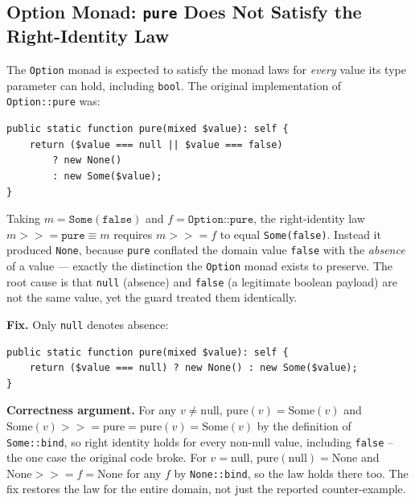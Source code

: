 \documentclass[a4paper,12pt,fleqn]{article}
\begin{document}
\subsection{Option Monad: \texttt{pure} Does Not Satisfy the Right-Identity Law}\label{sec:bug1}

The \texttt{Option} monad is expected to satisfy the monad laws for \emph{every} value its type parameter can hold, including \texttt{bool}. The original implementation of \texttt{Option::pure} was:

\begin{lstlisting}[caption={Original \texttt{Option::pure} (src/CategoryTheory.php)}]
public static function pure(mixed $value): self {
    return ($value === null || $value === false)
        ? new None()
        : new Some($value);
}
\end{lstlisting}

Taking $m = \mathtt{Some(false)}$ and $f = \texttt{Option::pure}$, the right-identity law $m \mathbin{>\!\!>\!\!=} \texttt{pure} \equiv m$ requires $m\mathbin{>\!\!>\!\!=}f$ to equal \texttt{Some(false)}. Instead it produced \texttt{None}, because \texttt{pure} conflated the domain value \texttt{false} with the \emph{absence} of a value — exactly the distinction the \texttt{Option} monad exists to preserve. The root cause is that \texttt{null} (absence) and \texttt{false} (a legitimate boolean payload) are not the same value, yet the guard treated them identically.

\textbf{Fix.} Only \texttt{null} denotes absence:
\begin{lstlisting}[caption={Fixed \texttt{Option::pure}}]
public static function pure(mixed $value): self {
    return ($value === null) ? new None() : new Some($value);
}
\end{lstlisting}

\textbf{Correctness argument.} For any $v \neq \mathrm{null}$, $\mathrm{pure}(v) = \mathrm{Some}(v)$ and $\mathrm{Some}(v)\mathbin{>\!\!>\!\!=}\mathrm{pure} = \mathrm{pure}(v) = \mathrm{Some}(v)$ by the definition of \texttt{Some::bind}, so right identity holds for every non-null value, including \texttt{false} -- the one case the original code broke. For $v=\mathrm{null}$, $\mathrm{pure}(\mathrm{null})=\mathrm{None}$ and $\mathrm{None}\mathbin{>\!\!>\!\!=}f=\mathrm{None}$ for any $f$ by \texttt{None::bind}, so the law holds there too. The fix restores the law for the entire domain, not just the reported counter-example.
\end{document}
